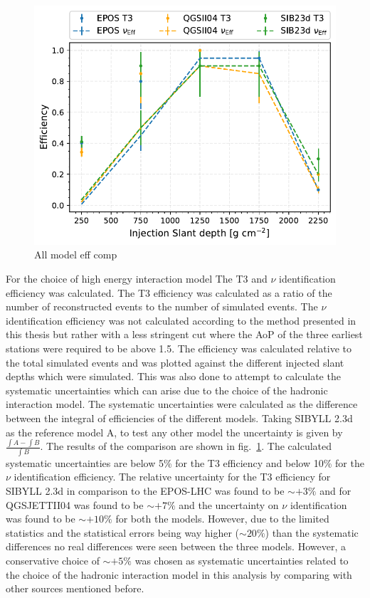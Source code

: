 \begin{figure}[h!]
  \centering
  \includegraphics[width=\textwidth]{thesis_figures/App2/Efficiency_vs_slant_comp_all_HModel.pdf}
  \caption{All model eff comp}
  \label{fig:Eff_vs_slant_comp_all_HModels}
\end{figure}


For the choice of high energy interaction model The T3 and $\nu$ identification efficiency was calculated. The T3 efficiency was calculated as a ratio of the number of reconstructed events to the number of simulated events. The $\nu$ identification efficiency was not calculated according to the method presented in this thesis but rather with a less stringent cut where the AoP of the three earliest stations were required to be above 1.5. The efficiency was calculated relative to the total simulated events and was plotted against the different injected slant depths which were simulated. This was also done to attempt to calculate the systematic uncertainties which can arise due to the choice of the hadronic interaction model. The systematic uncertainties were calculated as the difference between the integral of efficiencies of the different models. Taking SIBYLL 2.3d as the reference model A, to test any other model the uncertainty is given by $\frac{\int A - \int B}{\int B}$. The results of the comparison are shown in fig.~\ref{fig:Eff_vs_slant_comp_all_HModels}. The calculated systematic uncertainties are below 5\% for the T3 efficiency and below 10\% for the $\nu$ identification efficiency. The relative uncertainty for the T3 efficiency for SIBYLL 2.3d in comparison to the EPOS-LHC was found to be $\sim +3\%$ and for QGSJETTII04 was found to be $\sim + 7\%$ and the uncertainty on $\nu$ identification was found to be $\sim +10\%$ for both the models. However, due to the limited statistics and the statistical errors being way higher ($\sim 20\%$) than the systematic differences no real differences were seen between the three models. However, a conservative choice of $\sim +5\%$ was chosen as systematic uncertainties related to the choice of the hadronic interaction model in this analysis by comparing with other sources mentioned before.  


